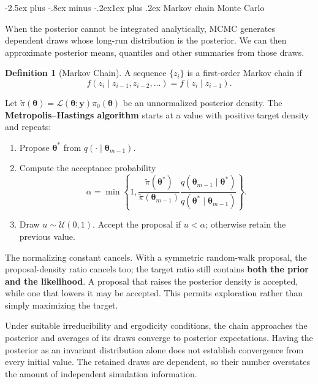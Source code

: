\documentclass[
  11pt,
]{book}
\makeatletter
\providecommand{\tightlist}{%
  \setlength{\itemsep}{0pt}\setlength{\parskip}{0pt}}
\renewcommand\subsection{\@startsection{subsection}{2}{\z@}
  {-2.5ex plus -.8ex minus -.2ex}{1ex plus .2ex}
  {\normalfont\large\bfseries\color{TextbookInk}}}
\theoremstyle{definition}
\newtheorem{definition}{Definition}[chapter]
\theoremstyle{definition}
\theoremstyle{definition}
\theoremstyle{definition}
\theoremstyle{remark}
\makeatother
\begin{document}
\subsection{Markov chain Monte Carlo}\label{markov-chain-monte-carlo}

When the posterior cannot be integrated analytically, MCMC generates dependent draws whose long-run distribution is the posterior. We can then approximate posterior means, quantiles and other summaries from those draws.

\begin{definition}[Markov Chain]
\protect\hypertarget{def:MC}{}\label{def:MC}A sequence \(\{z_i\}\) is a first-order Markov chain if
\[
f(z_i\mid z_{i-1},z_{i-2},\ldots)=f(z_i\mid z_{i-1}).
\]
\end{definition}

Let \(\widetilde\pi(\boldsymbol\theta)=\mathcal L(\boldsymbol\theta;\mathbf{y})\pi_0(\boldsymbol\theta)\) be an unnormalized posterior density. The \textbf{Metropolis--Hastings algorithm} starts at a value with positive target density and repeats:

\begin{enumerate}
\def\labelenumi{\arabic{enumi}.}
\tightlist
\item
  Propose \(\boldsymbol\theta^*\) from \(q(\cdot\mid\boldsymbol\theta_{m-1})\).
\item
  Compute the acceptance probability
  \begin{equation}
  \alpha=\min\left\{1,
  \frac{\widetilde\pi(\boldsymbol\theta^*)}{\widetilde\pi(\boldsymbol\theta_{m-1})}
  \frac{q(\boldsymbol\theta_{m-1}\mid\boldsymbol\theta^*)}{q(\boldsymbol\theta^*\mid\boldsymbol\theta_{m-1})}\right\}.
  \label{eq:mh-acceptance}
  \end{equation}
\item
  Draw \(u\sim\mathcal U(0,1)\). Accept the proposal if \(u<\alpha\); otherwise retain the previous value.
\end{enumerate}

The normalizing constant cancels. With a symmetric random-walk proposal, the proposal-density ratio cancels too; the target ratio still contains \textbf{both the prior and the likelihood}. A proposal that raises the posterior density is accepted, while one that lowers it may be accepted. This permits exploration rather than simply maximizing the target.

Under suitable irreducibility and ergodicity conditions, the chain approaches the posterior and averages of its draws converge to posterior expectations. Having the posterior as an invariant distribution alone does not establish convergence from every initial value. The retained draws are dependent, so their number overstates the amount of independent simulation information.
\end{document}
